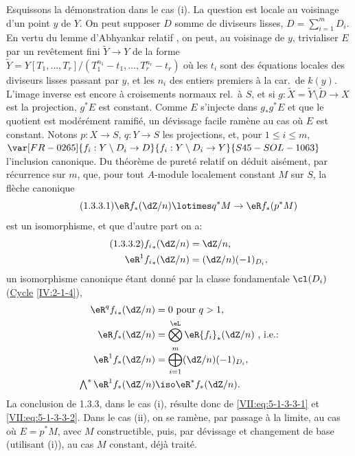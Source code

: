 Esquissons la démonstration dans le cas (i). La question est locale au 
voisinage d'un point $y$ de $Y$. On peut supposer $D$ somme de diviseurs 
lisses, $D=\sum_{i=1}^m D_i$. En vertu du lemme d'Abhyankar relatif 
, on peut, au voisinage de $y$, trivialiser $E$ par un 
revêtement fini $\widetilde Y\to Y$ de la forme 
$\widetilde Y=Y[T_1,\dots,T_r]/(T_1^{n_1}-t_1,\dots,T_r^{n_r}-t_r)$ où les 
$t_i$ sont des équations locales des diviseurs lisses passant par $y$, et les 
$n_i$ des entiers premiers à la car.\ de $k(y)$. L'image inverse 
 est encore à croisements normaux rel.\ à 
$S$, et si $g:\widetilde X=\widetilde Y\setminus \widetilde D\to X$ est la 
projection, $g^\ast E$ est constant. Comme $E$ s'injecte dans $g_\ast g^\ast E$ 
et que le quotient est modérément ramifié, un dévissage facile ramène 
au cas où $E$ est constant. Notons $p:X\to S$, $q:Y\to S$ les 
projections, et, pour $1\leqslant i\leqslant m$, $\var[FR-0265]{f_i:Y\setminus D_i \to D}{f_i:Y\setminus D_i \to Y}{S45-SOL-1063}$ 
l'inclusion canonique. Du théorème de pureté relatif  
on déduit aisément, par récurrence sur $m$, que, pour tout $A$-module 
localement constant $M$ sur $S$, la flèche canonique 
\begin{equation*}\tag{1.3.3.1}\label{VII:eq:5-1-3-3-1} %
  \eR f_\ast (\dZ/n)\lotimes q^\ast M\to \eR f_\ast (p^\ast M) 
\end{equation*}
est un isomorphisme, et que d'autre part on a: 
\begin{align*}\tag{1.3.3.2}\label{VII:eq:5-1-3-3-2}
  {f_i}_\ast(\dZ/n) &= \dZ/n \text{,} \\
  \eR^1 {f_i}_\ast (\dZ/n) &= (\dZ/n)(-1)_{D_i} \text{,} 
\end{align*}
un isomorphisme canonique étant donné par la classe fondamentale $\cl(D_i)$ 
(\hyperref[IV]{Cycle} \ref{IV:2-1-4}), 
\begin{align*}
  \eR^q {f_i}_\ast(\dZ/n) &= 0\text{ pour $q>1$,} \\
  \eR f_\ast (\dZ/n) &= \bigotimes^\eL \eR {f_i}_\ast (\dZ/n) \text{ , i.e.:} \\
  \eR^1 f_\ast(\dZ/n) &= \bigoplus_{i=1}^m (\dZ/n)(-1)_{D_i} \text{,} \\
  \textstyle\bigwedge^\ast \eR^1 f_\ast(\dZ/n) &\iso \eR^\ast f_\ast (\dZ/n) \text{.} 
\end{align*}
La conclusion de 1.3.3, dans le cas (i), résulte donc de 
\eqref{VII:eq:5-1-3-3-1} et \eqref{VII:eq:5-1-3-3-2}. Dans le cas (ii), on se 
ramène, par passage à la limite, au cas où $E=p^\ast M$, avec $M$ 
constructible, puis, par dévissage et changement de base (utilisant (i)), au 
cas $M$ constant, déjà traité. 


